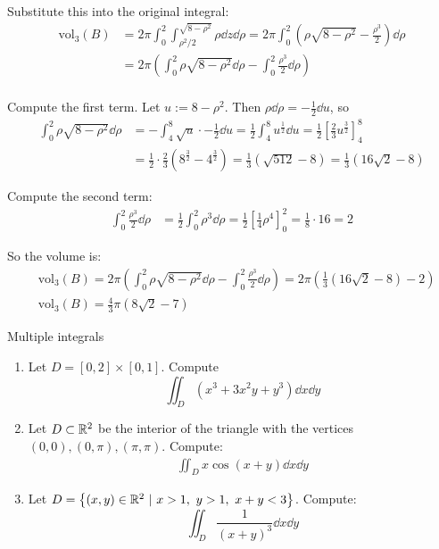\documentclass[12pt]{article}
\begin{document}
Substitute this into the original integral:
$$
\begin{aligned}
    \mathrm{vol}_3(B) &= 2\pi \int_{0}^{2} \int_{\rho^2/2}^{\sqrt{8 - \rho^2}} \rho \dd z \dd \rho = 2\pi \int_{0}^{2} \left(\rho\sqrt{8 - \rho^2} - \frac{\rho^3}{2} \right) \dd \rho \\
    &= 2\pi \left( \int_{0}^{2} \rho\sqrt{8 - \rho^2} \dd \rho - \int_{0}^{2} \frac{\rho^3}{2} \dd \rho \right) \\
\end{aligned}
$$

Compute the first term. Let $u := 8-\rho^2$. Then $\rho \dd \rho = -\frac{1}{2}\dd u$, so
$$
\begin{aligned}
    \int_{0}^{2} \rho\sqrt{8 - \rho^2} \dd \rho &= - \int_{4}^{8} \sqrt{u} \cdot -\frac{1}{2}\dd u = \frac{1}{2} \int_{4}^{8} u^\frac{1}{2} \dd u = \frac{1}{2} \left[ \frac{2}{3} u^\frac{3}{2} \right]_{4}^{8} \\
    &= \frac{1}{2} \cdot \frac{2}{3} \left( 8^\frac{3}{2} - 4^\frac{3}{2} \right) = \frac{1}{3}\left(\sqrt{512} - 8\right) = \frac{1}{3}\left(16 \sqrt{2} - 8\right)
\end{aligned}  
$$

Compute the second term:
$$
\begin{aligned}
    \int_{0}^{2} \frac{\rho^3}{2} \dd \rho &= \frac{1}{2} \int_{0}^{2} \rho^3 \dd \rho = \frac{1}{2} \left[ \frac{1}{4} \rho^4 \right]_0^2 = \frac{1}{8} \cdot 16 = 2
\end{aligned}
$$

So the volume is:
$$
\begin{aligned}
    &\mathrm{vol}_3(B) = 2\pi \left( \int_{0}^{2} \rho\sqrt{8 - \rho^2} \dd \rho - \int_{0}^{2} \frac{\rho^3}{2} \dd \rho \right) = 2\pi \left( \frac{1}{3}\left(16 \sqrt{2} - 8\right) - 2 \right)\\
    &\boxed{\mathrm{vol}_3(B) = \frac{4}{3}\pi\left(8 \sqrt{2} - 7\right)}
\end{aligned}
$$

\begin{problem}{Multiple integrals}{}
    \begin{enumerate}
        \item Let $D = [0, 2] \times [0, 1]$. Compute
        $$
            \iint_D \left( x^3 + 3x^2y +y^3 \right) \dd x \dd y
        $$

        \item Let $D \subset \mathbb{R}^2$ be the interior of the triangle with the vertices $(0, 0), (0, \pi), (\pi, \pi)$. Compute:
        $$
            \begin{aligned}
                \iint_D x\cos(x + y) \dd x \dd y
            \end{aligned}
        $$

        \item Let $D = \left\{ (x, y) \in \mathbb{R}^2 \ |\ x > 1,\ y > 1,\ x + y < 3 \right\}$. Compute:
        $$
            \iint_D \frac{1}{(x + y)^3} \dd x \dd y
        $$
    \end{enumerate}
\end{problem}
\end{document}
